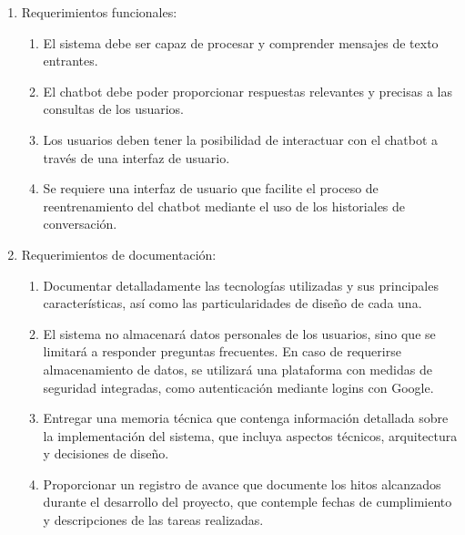 \begin{enumerate}
    \item Requerimientos funcionales:
        \begin{enumerate}
            \item El sistema debe ser capaz de procesar y comprender mensajes de texto entrantes.
            \item El chatbot debe poder proporcionar respuestas relevantes y precisas a las consultas de los usuarios.
            \item Los usuarios deben tener la posibilidad de interactuar con el chatbot a través de una interfaz de usuario.
            \item Se requiere una interfaz de usuario que facilite el proceso de reentrenamiento del chatbot mediante el uso de los historiales de conversación.
        \end{enumerate}
    \item Requerimientos de documentación:
        \begin{enumerate}
            \item Documentar detalladamente las tecnologías utilizadas y sus principales características, así como las particularidades de diseño de cada una.
            \item El sistema no almacenará datos personales de los usuarios, sino que se limitará a responder preguntas frecuentes. En caso de requerirse almacenamiento de datos, se utilizará una plataforma con medidas de seguridad integradas, como autenticación mediante logins con Google.
            \item Entregar una memoria técnica que contenga información detallada sobre la implementación del sistema, que incluya aspectos técnicos, arquitectura y decisiones de diseño.
            \item Proporcionar un registro de avance que documente los hitos alcanzados durante el desarrollo del proyecto, que contemple fechas de cumplimiento y descripciones de las tareas realizadas.
         \end{enumerate}
		 

\end{enumerate}
